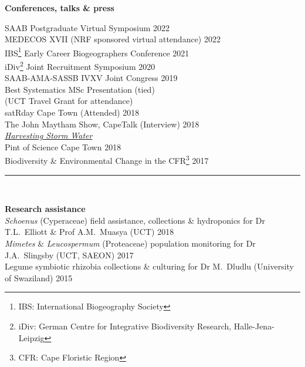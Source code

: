 \documentclass[10pt]{article}
\begin{document}
\begin{multicols}{2}
\vfill

\textbf{\large Conferences, talks \& press} %

SAAB Postgraduate Virtual Symposium                      \hfill {\small 2022} \\
MEDECOS XVII {\small (NRF sponsored virtual attendance)} \hfill {\small 2022} \\
IBS\footnote{IBS: International Biogeography Society}
  Early Career Biogeographers Conference                 \hfill {\small 2021} \\
iDiv\footnote{iDiv: German Centre for Integrative
  Biodiversity Research, Halle-Jena-Leipzig} Joint
  Recruitment Symposium                                  \hfill {\small 2020} \\
SAAB-AMA-SASSB IVXV Joint Congress                       \hfill {\small 2019} \\
  \hspace{2em} {\small Best Systematics MSc Presentation
    (tied)}                                                                   \\
  \hspace{2em} {\small (UCT Travel Grant for attendance)}                     \\
satRday Cape Town {\small (Attended)}                    \hfill {\small 2018} \\
The John Maytham Show, CapeTalk {\small (Interview)}     \hfill {\small 2018} \\
  \hspace{2em} {\small \href{https://www.capetalk.co.za/articles/328900/harvesting-stormwater-from-liesbeek-river-may-aid-ct-water-supply-students-find}
    {\textit{Harvesting Storm Water}}}                                        \\
Pint of Science Cape Town                                \hfill {\small 2018} \\
Biodiversity \& Environmental Change in the CFR\footnote{
  CFR: Cape Floristic Region}                            \hfill {\small 2017}

\end{multicols} %

\hrule

\

\textbf{Research assistance} \\ %
\textit{Schoenus} (Cyperaceae)
  field assistance, collections \& hydroponics
  for Dr T.L.~Elliott \& Prof A.M.~Muasya
  {\small (UCT)}                                         \hfill {\small 2018} \\
\textit{Mimetes} \& \textit{Leucospermum} (Proteaceae)
  population monitoring
  for Dr J.A.~Slingsby
  {\small (UCT, SAEON)}                                  \hfill {\small 2017} \\
Legume symbiotic rhizobia
  collections \& culturing
  for Dr M.~Dludlu
  {\small (University of Swaziland)}                     \hfill {\small 2015} \\
\end{document}
